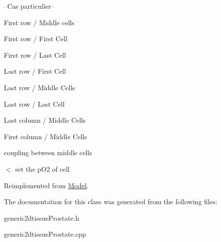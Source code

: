 --Cas particulier--

First row / Middle cells

First row / First Cell

First row / Last Cell

Last row / First Cell

Last row / Middle Cells

Last row / Last Cell

Last column / Middle Cells

First column / Middle Cells

coupling between middle cells

$<$ set the p\+O2 of cell 

Reimplemented from \hyperlink{classModel}{Model}.



The documentation for this class was generated from the following files\+:\begin{DoxyCompactItemize}
\item 
generic2dtissue\+Prostate.\+h\item 
generic2dtissue\+Prostate.\+cpp\end{DoxyCompactItemize}
